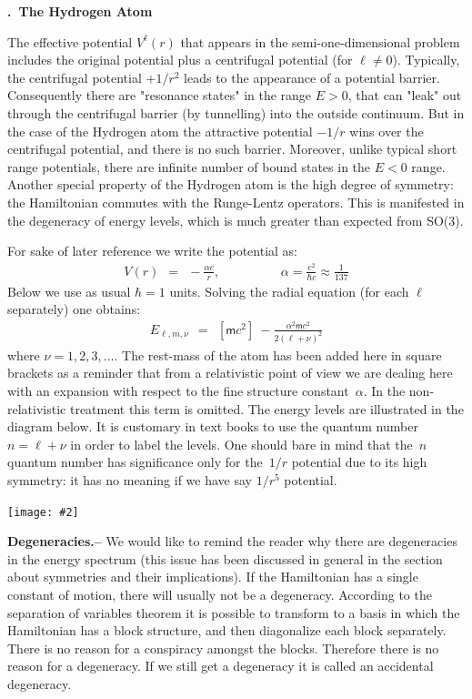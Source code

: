 \documentclass[onecolumn,fleqn, 11pt]{revtex4}
\newcommand{\mass}{\mathsf{m}}
\newcommand{\putgraph}[2][0.30\hsize]{\texttt{[image: \#2]}}
\newcommand{\beq}{\begin{eqnarray}}
\newcommand{\eeq}{\end{eqnarray}}
\renewcommand{\thesubsection}{\arabic{subsection}}
\renewcommand{\thesubsubsection}{\arabic{subsubsection}}
\newcommand{\sheadC}[1]
{
\addtocounter{subsubsection}{1}
\vspace{5mm}
{\bf \thesubsection.\thesubsubsection \ #1}  
\nopagebreak
\phantomsection
}
\begin{document}
\sheadC{The Hydrogen Atom} 


The effective potential ${V^{\ell}(r)}$ that appears 
in the semi-one-dimensional problem includes the 
original potential plus a centrifugal potential 
(for ${\ell \ne 0}$). Typically, the centrifugal 
potential ${ +{1}/{r^2} }$ leads to the appearance 
of a potential barrier. 
Consequently there are "resonance states" 
in the range ${E>0}$, that can "leak" out through 
the centrifugal barrier (by tunnelling) 
into the outside continuum.
But in the case of the Hydrogen atom the attractive 
potential ${-{1}/{r}}$ wins over the centrifugal potential, 
and there is no such barrier. 
Moreover, unlike typical short range potentials, 
there are infinite number of bound states in the ${E<0}$ range. 
Another special property of the Hydrogen 
atom is the high degree of symmetry: the Hamiltonian commutes 
with the Runge-Lentz operators. This is manifested in the 
degeneracy of energy levels, which is much greater 
than expected from SO(3).

For sake of later reference we write the potential as:
\beq
V(r) \ \ = \ \ -\frac{\alpha c}{r}, \hspace{2cm} \alpha=\frac{e^2}{\hbar c} \approx  \frac{1}{137}
\eeq
Below we use as usual ${\hbar=1}$ units. 
Solving the radial equation (for each ${\ell}$ separately) one obtains:
\beq
E_{\ell ,m, \nu} \ \ = \ \ [\mass c^2] \ - \frac{\alpha^2 \mass c^2}{2(\ell+\nu)^2} 
\eeq
where ${ \nu = 1,2,3, \dots  }$.
The rest-mass of the atom has been added here in square brackets 
as a reminder that from a relativistic point of view we are dealing 
here with an expansion with respect to the fine structure constant~$\alpha$.
In the non-relativistic treatment this term is omitted. 
The energy levels are illustrated in the diagram below.
It is customary in text books to use the quantum number ${n=\ell+\nu}$ 
in order to label the levels. One should bare in mind that the~$n$  
quantum number has significance only for the~$1/r$ potential 
due to its high symmetry: it has no meaning if we have say ${1/r^5}$ potential.

\begin{center}
\putgraph[0.45\hsize]{HydrogenEnergyLevels} 
\end{center}



{\bf Degeneracies.-- }
We would like to remind the reader 
why there are degeneracies in the energy spectrum 
(this issue has been discussed in general in the section 
about symmetries and their implications).  
If the Hamiltonian has a single constant 
of motion, there will usually not be a degeneracy. 
According to the separation of variables theorem 
it is possible to transform to a basis in which 
the Hamiltonian has a block structure, 
and then diagonalize each block separately. 
There is no reason for a conspiracy amongst the 
blocks. Therefore there is no reason for a degeneracy. 
If we still get a degeneracy it is 
called an accidental degeneracy.  
\end{document}
